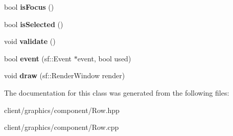 \begin{DoxyCompactItemize}
\item 
\hypertarget{classgraphics_1_1_row_ab29744abbd3756a1f8f9f01029515ac4}{bool {\bfseries is\-Focus} ()}\label{classgraphics_1_1_row_ab29744abbd3756a1f8f9f01029515ac4}

\item 
\hypertarget{classgraphics_1_1_row_a72b3e0b8b4e540940039cbb79ada50fd}{bool {\bfseries is\-Selected} ()}\label{classgraphics_1_1_row_a72b3e0b8b4e540940039cbb79ada50fd}

\item 
\hypertarget{classgraphics_1_1_row_a3768f8b4b147f9dffc32b410be28f450}{void {\bfseries validate} ()}\label{classgraphics_1_1_row_a3768f8b4b147f9dffc32b410be28f450}

\item 
\hypertarget{classgraphics_1_1_row_a7428faf660501f7ab154c30433eb6a56}{bool {\bfseries event} (sf\-::\-Event $\ast$event, bool used)}\label{classgraphics_1_1_row_a7428faf660501f7ab154c30433eb6a56}

\item 
\hypertarget{classgraphics_1_1_row_acbc7a348d515106fc5ca453ba57d8ded}{void {\bfseries draw} (sf\-::\-Render\-Window render)}\label{classgraphics_1_1_row_acbc7a348d515106fc5ca453ba57d8ded}

\end{DoxyCompactItemize}


The documentation for this class was generated from the following files\-:\begin{DoxyCompactItemize}
\item 
client/graphics/component/Row.\-hpp\item 
client/graphics/component/Row.\-cpp\end{DoxyCompactItemize}
